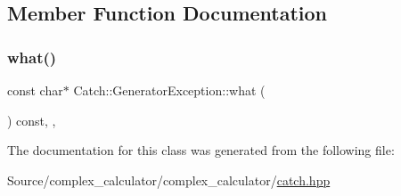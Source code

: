 \subsection{Member Function Documentation}
\mbox{\label{class_catch_1_1_generator_exception_ade029163144d136f12187e5b9a0161d5}} 
\subsubsection{\texorpdfstring{what()}{what()}}
{\footnotesize\ttfamily const char$\ast$ Catch\+::\+Generator\+Exception\+::what (\begin{DoxyParamCaption}{ }\end{DoxyParamCaption}) const\hspace{0.3cm}{\ttfamily [final]}, {\ttfamily [override]}, {\ttfamily [noexcept]}}



The documentation for this class was generated from the following file\+:\begin{DoxyCompactItemize}
\item 
Source/complex\+\_\+calculator/complex\+\_\+calculator/\mbox{\hyperlink{catch_8hpp}{catch.\+hpp}}\end{DoxyCompactItemize}
